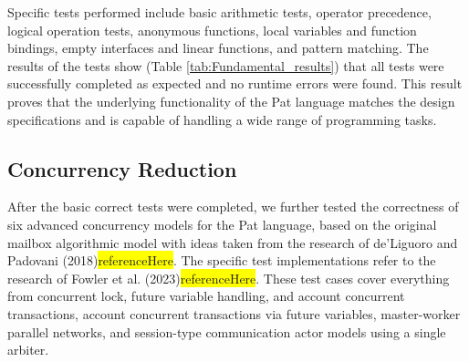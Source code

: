 \documentclass{l4proj}
\begin{document}
Specific tests performed include basic arithmetic tests, operator precedence, logical operation tests, anonymous functions, local variables and function bindings, empty interfaces and linear functions, and pattern matching. The results of the tests show (Table \ref{tab:Fundamental_results}) that all tests were successfully completed as expected and no runtime errors were found. This result proves that the underlying functionality of the Pat language matches the design specifications and is capable of handling a wide range of programming tasks.

\begin{table}[ht]
\centering
\renewcommand{\arraystretch}{1.1}
\caption{Basic Correct Test Results}
\label{tab:Fundamental_results}
\end{table}




\subsection{Concurrency Reduction}
After the basic correct tests were completed, we further tested the correctness of six advanced concurrency models for the Pat language, based on the original mailbox algorithmic model with ideas taken from the research of de'Liguoro and Padovani (2018)\colorbox{yellow}{referenceHere}. The specific test implementations refer to the research of Fowler et al. (2023)\colorbox{yellow}{referenceHere}. These test cases cover everything from concurrent lock, future variable handling, and account concurrent transactions, account concurrent transactions via future variables, master-worker parallel networks, and session-type communication actor models using a single arbiter.
\end{document}
